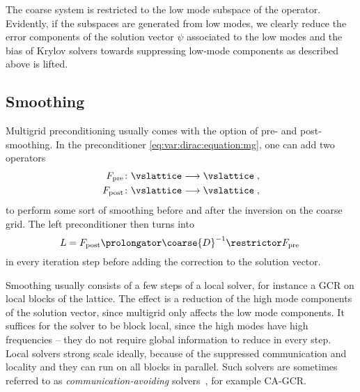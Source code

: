 The coarse system is restricted to the low mode subspace of the operator.
Evidently, if the subspaces are generated from low modes, we clearly reduce the error components of the solution vector $\psi$ associated to the low modes and the bias of Krylov solvers towards suppressing low-mode components as described above is lifted.

\subsection{Smoothing}

Multigrid preconditioning usually comes with the option of pre- and post-smoothing.
In the preconditioner \cref{eq:var:dirac:equation:mg}, one can add two operators
\begin{align}
F_{\text{pre}}  &\colon \vslattice \longrightarrow \vslattice \;, \\
F_{\text{post}} &\colon \vslattice \longrightarrow \vslattice \;,
\end{align}
to perform some sort of smoothing before and after the inversion on the coarse grid.
The left preconditioner then turns into
\begin{equation}
L = F_{\text{post}} \prolongator \coarse{D}^{-1} \restrictor F_{\text{pre}} \;
\end{equation}
in every iteration step before adding the correction to the solution vector.

Smoothing usually consists of a few steps of a local solver, for instance a GCR on local blocks of the lattice.
The effect is a reduction of the high mode components of the solution vector, since multigrid only affects the low mode components.
It suffices for the solver to be block local, since the high modes have high frequencies -- they do not require global information to reduce in every step.
Local solvers strong scale ideally, because of the suppressed communication and locality and they can run on all blocks in parallel.
Such solvers are sometimes referred to as \emph{communication-avoiding} solvers~\cite{naumov2016s}, for example CA-GCR.

